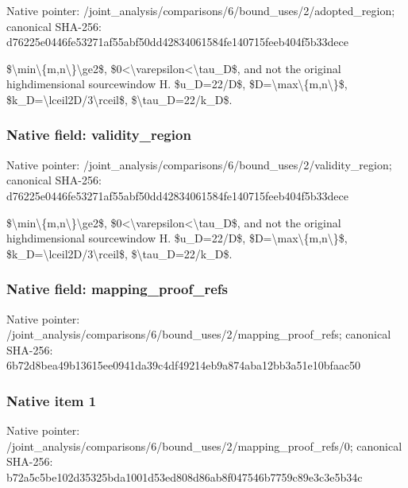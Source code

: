 \documentclass[10pt,a4paper]{article}
\begin{document}
Native pointer: /joint\_analysis/comparis\allowbreak{}ons/6/bound\_uses/2/adopt\allowbreak{}ed\_region; canonical SHA-256: d76225e0446fe53271af55ab\allowbreak{}f50dd42834061584fe140715\allowbreak{}feeb404f5b33dece


\$\textbackslash{}min\textbackslash{}\{m,n\textbackslash{}\}\textbackslash{}ge2\$, \$0<\textbackslash{}varepsilon<\textbackslash{}tau\_D\$, and not the original highdimensional sourcewindow H. \$u\_D=22/D\$, \$D=\textbackslash{}max\textbackslash{}\{m,n\textbackslash{}\}\$, \$k\_D=\textbackslash{}lceil2D/3\textbackslash{}rceil\$, \$\textbackslash{}tau\_D=22/k\_D\$.


\subsubsection{Native field: validity\_region}


Native pointer: /joint\_analysis/comparis\allowbreak{}ons/6/bound\_uses/2/valid\allowbreak{}ity\_region; canonical SHA-256: d76225e0446fe53271af55ab\allowbreak{}f50dd42834061584fe140715\allowbreak{}feeb404f5b33dece


\$\textbackslash{}min\textbackslash{}\{m,n\textbackslash{}\}\textbackslash{}ge2\$, \$0<\textbackslash{}varepsilon<\textbackslash{}tau\_D\$, and not the original highdimensional sourcewindow H. \$u\_D=22/D\$, \$D=\textbackslash{}max\textbackslash{}\{m,n\textbackslash{}\}\$, \$k\_D=\textbackslash{}lceil2D/3\textbackslash{}rceil\$, \$\textbackslash{}tau\_D=22/k\_D\$.


\subsubsection{Native field: mapping\_proof\_refs}


Native pointer: /joint\_analysis/comparis\allowbreak{}ons/6/bound\_uses/2/mappi\allowbreak{}ng\_proof\_refs; canonical SHA-256: 6b72d8bea49b13615ee0941d\allowbreak{}a39c4df49214eb9a874aba12\allowbreak{}bb3a51e10bfaac50



\subsubsection{Native item 1}


Native pointer: /joint\_analysis/comparis\allowbreak{}ons/6/bound\_uses/2/mappi\allowbreak{}ng\_proof\_refs/0; canonical SHA-256: b72a5c5be102d35325bda100\allowbreak{}1d53ed808d86ab8f047546b7\allowbreak{}759c89e3c3e5b34c
\end{document}
